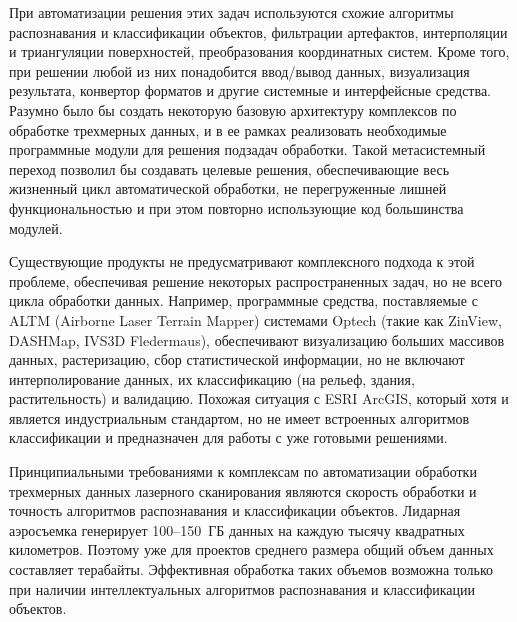 \begin{multicols}{2}
   При автоматизации решения этих задач используются схожие алгоритмы 
распознавания и клас\-сификации объектов, фильтрации артефактов, 
интерполяции и триангуляции поверхностей, преобразования координатных 
систем. Кроме того, при решении любой из них понадобится ввод/вывод 
данных, визуализация результата, конвертор форматов и другие системные и 
интерфейсные средства. Разумно было бы создать некоторую базовую 
архитектуру комплексов по обработке трехмерных данных, и в ее рамках реализовать 
необходимые программные модули для решения подзадач обработки. Такой 
метасистемный переход позволил бы создавать целевые решения, 
обеспечивающие весь жизненный цикл автоматической обработки, не 
перегруженные лишней функциональностью и при этом повторно 
использующие код большинства модулей.
   
   Существующие продукты не предусматривают комплексного подхода к этой 
проблеме, обеспечивая решение некоторых распространенных задач, но не 
всего цикла обработки данных. Например, программные средства, 
поставляемые с ALTM (Airborne Laser Terrain Mapper) сис\-те\-ма\-ми Optech (такие как ZinView, DASHMap, 
IVS3D Fledermaus), обеспечивают визуализацию больших массивов данных, 
растеризацию, сбор статистической информации, но не включают 
интерполирование данных, их классификацию (на рель\-еф, здания, 
растительность) и валидацию. Похожая ситуация с ESRI ArcGIS, который хотя 
и является индустриальным стандартом, но не имеет встроенных алгоритмов 
классификации и предназначен для работы с уже готовыми решениями.
   
   Принципиальными требованиями к комплексам по автоматизации обработки 
трехмерных данных лазерного сканирования являются скорость обработки и точность 
алгоритмов распознавания и классификации объектов. Лидарная аэросъемка 
генерирует 100--150~ГБ данных на каждую тысячу квад\-рат\-ных километров. Поэтому уже 
для проектов среднего размера общий объем данных составляет терабайты. 
Эффективная обработка таких объемов возможна только при наличии 
интеллектуальных алгоритмов распознавания и классификации объектов.
   

\end{multicols}
